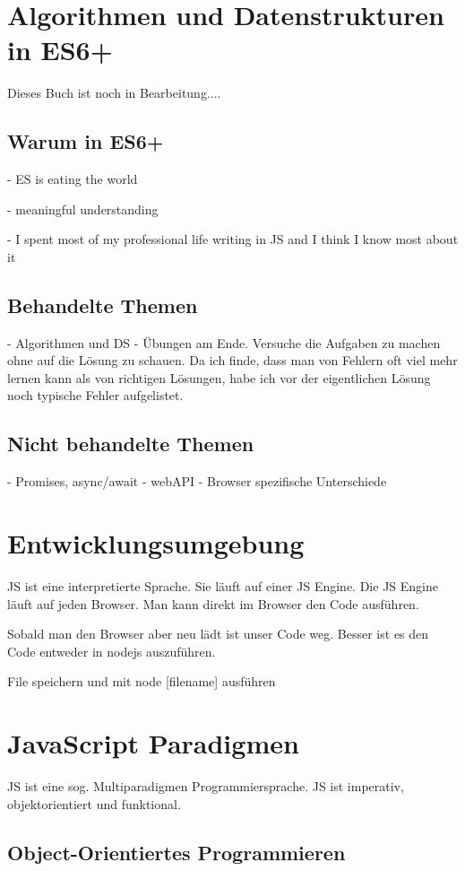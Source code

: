 \documentclass[babel]{book}
\begin{document}
\tableofcontents
\chapter{Algorithmen und Datenstrukturen in ES6+}

Dieses Buch ist noch in Bearbeitung....
\section{Warum in ES6+}
- ES is eating the world

- meaningful understanding

- I spent most of my professional life writing in JS and I think I know most about it

\section{Behandelte Themen}
- Algorithmen und DS
- Übungen am Ende. Versuche die Aufgaben zu machen ohne auf die Lösung zu schauen. Da ich finde, dass man von Fehlern oft viel mehr lernen kann als von richtigen Lösungen, habe ich vor der eigentlichen Lösung noch typische Fehler aufgelistet.

\section{Nicht behandelte Themen}
- Promises, async/await
- webAPI
- Browser spezifische Unterschiede

\chapter{Entwicklungsumgebung}
JS ist eine interpretierte Sprache. Sie läuft auf einer JS Engine. Die JS Engine läuft auf jeden Browser. Man kann direkt im Browser den Code ausführen.

Sobald man den Browser aber neu lädt ist unser Code weg. Besser ist es den Code entweder in nodejs auszuführen.

File speichern und mit node [filename] ausführen
\chapter{JavaScript Paradigmen}
JS ist eine sog. Multiparadigmen Programmiersprache. JS ist imperativ, objektorientiert und funktional. 
\section{Object-Orientiertes Programmieren}
\end{document}

